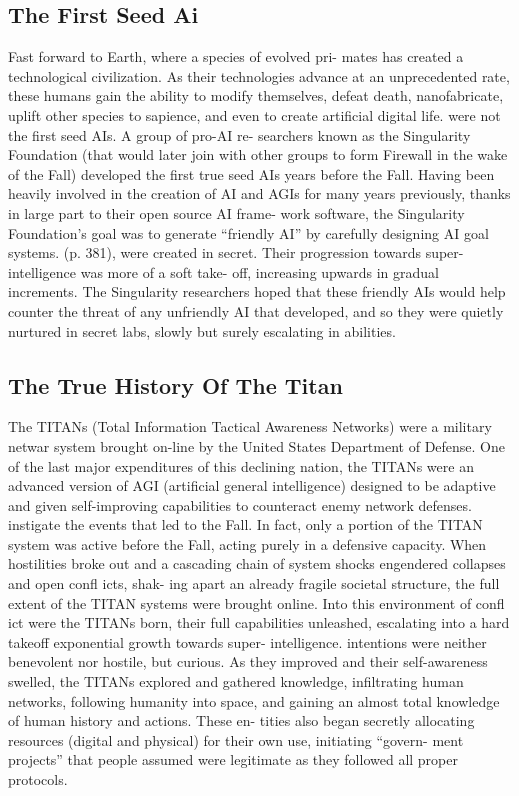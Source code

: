 \subsection{The First Seed Ai}

Fast forward to Earth, where a species of evolved pri-
mates has created a technological civilization. As their 
technologies advance at an unprecedented rate, these 
humans gain the ability to modify themselves, defeat 
death, nanofabricate, uplift other species to sapience, 
and even to create artificial digital life. 
were not the first seed AIs. A group of pro-AI re-
searchers known as the Singularity Foundation (that 
would later join with other groups to form Firewall in 
the wake of the Fall) developed the first true seed AIs 
years before the Fall. Having been heavily involved in 
the creation of AI and AGIs for many years previously, 
thanks in large part to their open source AI frame-
work software, the Singularity Foundation's goal was 
to generate ``friendly AI'' by carefully designing AI 
goal systems.
(p. 381), were created in secret. Their progression 
towards super-intelligence was more of a soft take-
off, increasing upwards in gradual increments. The 
Singularity researchers hoped that these friendly AIs 
would help counter the threat of any unfriendly AI 
that developed, and so they were quietly nurtured in 
secret labs, slowly but surely escalating in abilities. 

\subsection{The True History Of The Titan}

The TITANs (Total Information Tactical Awareness 
Networks) were a military netwar system brought 
on-line by the United States Department of Defense. 
One of the last major expenditures of this declining 
nation, the TITANs were an advanced version of AGI 
(artificial general intelligence) designed to be adaptive 
and given self-improving capabilities to counteract 
enemy network defenses. 
instigate the events that led to the Fall. In fact, only 
a portion of the TITAN system was active before 
the Fall, acting purely in a defensive capacity. When 
hostilities broke out and a cascading chain of system 
shocks engendered collapses and open confl icts, shak-
ing apart an already fragile societal structure, the full 
extent of the TITAN systems were brought online. 
Into this environment of confl ict were the TITANs 
born, their full capabilities unleashed, escalating into 
a hard takeoff exponential growth towards super-
intelligence.
intentions were neither benevolent nor hostile, but 
curious. As they improved and their self-awareness 
swelled, the TITANs explored and gathered 
knowledge, infiltrating human networks, following 
humanity into space, and gaining an almost total 
knowledge of human history and actions. These en-
tities also began secretly allocating resources (digital 
and physical) for their own use, initiating ``govern-
ment projects'' that people assumed were legitimate 
as they followed all proper protocols.

